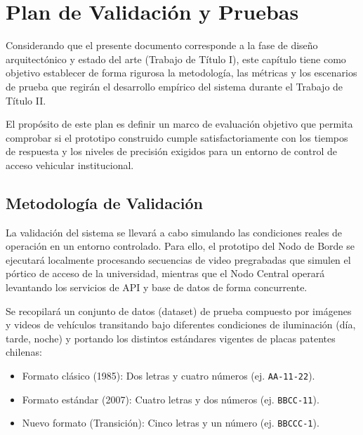 
\chapter{Plan de Validación y Pruebas}

Considerando que el presente documento corresponde a la fase de diseño arquitectónico y estado del arte (Trabajo de Título I), este capítulo tiene como objetivo establecer de forma rigurosa la metodología, las métricas y los escenarios de prueba que regirán el desarrollo empírico del sistema durante el Trabajo de Título II.

El propósito de este plan es definir un marco de evaluación objetivo que permita comprobar si el prototipo construido cumple satisfactoriamente con los tiempos de respuesta y los niveles de precisión exigidos para un entorno de control de acceso vehicular institucional.

\section{Metodología de Validación}

La validación del sistema se llevará a cabo simulando las condiciones reales de operación en un entorno controlado. Para ello, el prototipo del Nodo de Borde se ejecutará localmente procesando secuencias de video pregrabadas que simulen el pórtico de acceso de la universidad, mientras que el Nodo Central operará levantando los servicios de API y base de datos de forma concurrente.

Se recopilará un conjunto de datos (dataset) de prueba compuesto por imágenes y videos de vehículos transitando bajo diferentes condiciones de iluminación (día, tarde, noche) y portando los distintos estándares vigentes de placas patentes chilenas:
\begin{itemize}
    \item Formato clásico (1985): Dos letras y cuatro números (ej. \texttt{AA-11-22}).
    \item Formato estándar (2007): Cuatro letras y dos números (ej. \texttt{BBCC-11}).
    \item Nuevo formato (Transición): Cinco letras y un número (ej. \texttt{BBCCC-1}).
\end{itemize}

